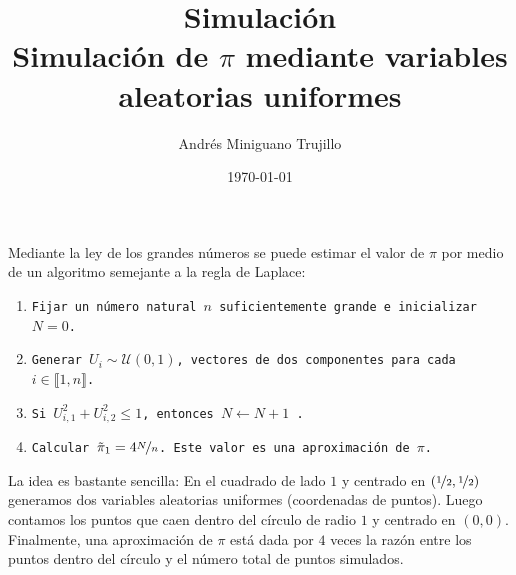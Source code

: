 \documentclass[11pt]{article}
\title{{\large Simulación} \\Simulación de \(\pi\) mediante variables aleatorias uniformes}
\author{Andr\'{e}s Miniguano Trujillo}
\date{\today}
\newcommand{\llb}{\llbracket}
\newcommand{\rrb}{\rrbracket}
\begin{document}

\maketitle


Mediante la ley de los grandes números se puede estimar el valor de \(\pi\) por medio de un algoritmo semejante a la regla de Laplace:
    \begin{enumerate}
        \item \texttt{Fijar un número natural \(n\) suficientemente grande e inicializar \(N=0\).}
        \item \texttt{Generar \(U_i \sim \mathcal{U}(0,1)\), vectores de dos componentes para cada \(i\in \llb 1,n \rrb \).}
        \item \texttt{Si \( U_{i,1}^2 + U_{i,2}^2 \leq 1 \), entonces \(N \leftarrow N+1\) .}
        \item \texttt{Calcular \( \tilde{\pi}_1 = 4\nicefrac{N}{n} \). Este valor es una aproximación de \(\pi\).}
    \end{enumerate}

La idea es bastante sencilla: En el cuadrado de lado \(1\) y centrado en \( (\nicefrac 1 2, \nicefrac 1 2) \) generamos dos variables aleatorias uniformes (coordenadas de puntos). Luego contamos los puntos que caen dentro del círculo de radio \(1\) y centrado en \((0,0)\). Finalmente, una aproximación de \(\pi\) está dada por \(4\) veces la razón entre los puntos dentro del círculo y el número total de puntos simulados.
\end{document}
